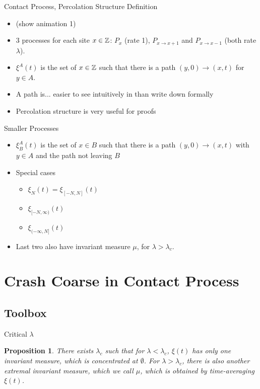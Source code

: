 \documentclass{beamer}
\newtheorem*{proposition}{Proposition}
\newcommand{\ignore}[1]{}
\newcommand{\rb}{\ignore{[}]}
\begin{document}
\begin{frame}{Contact Process, Percolation Structure Definition}
  \begin{itemize}
    \item (show animation 1)
    \pause
    \item 3 processes for each site $x \in \mathbb{Z}$: $P_{x}$ (rate 1), $P_{x \to x+1}$ and $P_{x \to x-1}$ (both rate $\lambda$).
    \pause
    \item $\xi^{A}(t)$ is the set of $x \in \mathbb{Z}$ such that there is a path $(y,0) \to (x,t)$ for $y \in A$.
    \pause
    \item A path is... \pause easier to see intuitively in than write down formally
    \pause
    \item Percolation structure is very useful for proofs
  \end{itemize}
\end{frame}

\begin{frame}{Smaller Processes}
  \begin{itemize}
    \item $\xi_{B}^{A}(t)$ is the set of $x \in B$ such that there is a path $(y,0) \to (x,t)$ with $y \in A$ and the path not leaving $B$
    \item Special cases
    \begin{itemize}
      \item $\xi_{N}(t) = \xi_{[-N,N]}(t)$
      \item $\xi_{[-N,\infty)}(t)$
      \item $\xi_{(-\infty,N\rb}(t)$
    \end{itemize}
    \item Last two also have invariant measure $\mu$, for $\lambda > \lambda_{c}$.
  \end{itemize}
\end{frame}

\section{Crash Coarse in Contact Process}

\subsection{Toolbox}

\begin{frame}{Critical $\lambda$}
  \begin{proposition}
    There exists $\lambda_{c}$ such that for $\lambda < \lambda_{c}$, $\xi(t)$ has only one invariant measure, which is concentrated at $\emptyset$. For $\lambda > \lambda_{c}$, there is also another extremal invariant measure, which we call $\mu$, which is obtained by time-averaging $\xi(t)$.
  \end{proposition}
\end{frame}
\end{document}
